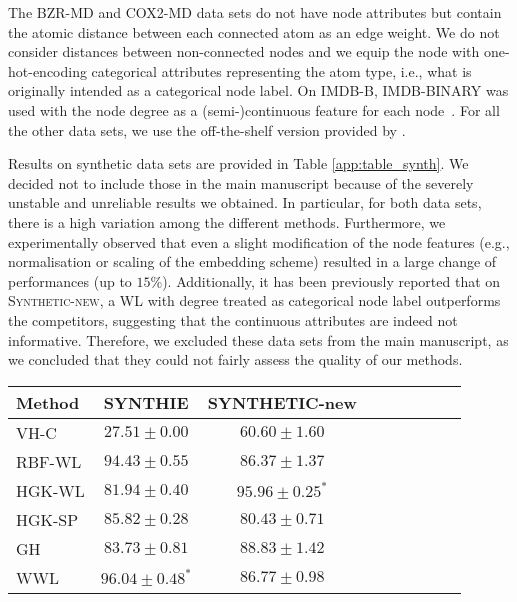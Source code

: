 \documentclass{article}
\begin{document}
The \textsc{BZR-MD} and \textsc{COX2-MD} data sets do not have node attributes but contain the atomic distance between each connected atom as an edge weight. We do not consider distances between non-connected nodes \citep{kriege2012subgraph} and we equip the node with one-hot-encoding categorical attributes representing the atom type, i.e., what is originally intended as a categorical node label. On \textsc{IMDB-B}, \textsc{IMDB-BINARY} was used with the node degree as a \mbox{(semi-)continuous} feature for each node~\citep{yanardag2015deep}. For all the other data sets, we use the off-the-shelf version provided by \citet{repoker2016}.

Results on synthetic data sets are provided in Table \ref{app:table_synth}. We decided not to include those in the main manuscript because of the severely unstable and unreliable results we obtained. In particular, for both data sets, there is a high variation among the different methods. Furthermore, we experimentally observed that even a slight modification of the node features (e.g., normalisation or scaling of the embedding scheme) resulted in a large change of performances (up to $15\%$). Additionally, it has been previously reported \citep{morris2016faster,feragen2013scalable} that on \textsc{Synthetic-new}, a WL with degree treated as categorical node label outperforms the competitors, suggesting that the continuous attributes are indeed not informative. Therefore, we excluded these data sets from the main manuscript, as we concluded that they could not fairly assess the quality of our methods.


\begin{table*}[t]
\caption{Classification accuracies on synthetic graphs with continuous node attributes. Comparison of hash graph kernel (HGK-WL, HGK-SP), GraphHopper kernel (GH), and our method (WWL).}
\label{app:table_synth}
\vskip 0.15in
\begin{center}
\begin{small}
\begin{sc}
\setlength{\tabcolsep}{0.5pt}
    \begin{tabular}{lcccccccc}
    \toprule
    Method & SYNTHIE & SYNTHETIC-new \\
    \midrule
    VH-C & $27.51\pm 0.00$ & $60.60 \pm 1.60$\\
    RBF-WL &  $94.43 \pm 0.55$ & $86.37 \pm 1.37$ \\
    \midrule
    HGK-WL    & $81.94 \pm 0.40$ & $\mathbf{95.96 \pm 0.25^\ast}$   \\
    HGK-SP & $85.82 \pm 0.28$ & $80.43 \pm 0.71$ \\
    \midrule
    GH  &  $83.73 \pm 0.81$ & $88.83 \pm 1.42$ \\
    \midrule
    WWL   & $\mathbf{96.04 \pm 0.48^\ast}$ & $86.77 \pm 0.98$\\
    \bottomrule
    \end{tabular}
\end{sc}
\end{small}
\end{center}
\vskip -0.1in
\end{table*}
\end{document}

